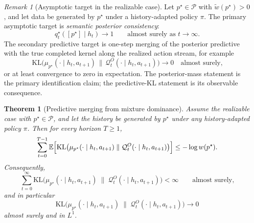 \documentclass[11pt]{article}
\newtheorem{theorem}[definition]{Theorem}
\theoremstyle{remark}
\newtheorem{remark}[definition]{Remark}
\newcommand{\Pcal}{\mathcal{P}}
\newcommand{\Qcal}{\mathcal{Q}}
\newcommand{\E}{\mathbb{E}}
\newcommand{\KL}{\mathrm{KL}}
\newcommand{\wt}{\widetilde}
\begin{document}
\begin{remark}[Asymptotic target in the realizable case]
Let \(p^\star \in \Pcal\) with \(\wt w(p^\star) > 0\), and let data be generated by \(p^\star\) under a history-adapted policy \(\pi\). The primary asymptotic target is \emph{semantic posterior consistency}:
\[
q_t^\star([p^\star]\mid h_t) \to 1
\qquad\text{almost surely as } t\to\infty.
\]
The secondary predictive target is one-step merging of the posterior predictive with the true completed kernel along the realized action stream, for example
\[
\KL\bigl(\mu_{p^\star}(\cdot\mid h_t,a_{t+1}) \,\|\, \Qcal_t^O(\cdot\mid h_t,a_{t+1})\bigr) \to 0
\quad\text{almost surely,}
\]
or at least convergence to zero in expectation. The posterior-mass statement is the primary identification claim; the predictive-KL statement is its observable consequence.
\end{remark}

\begin{theorem}[Predictive merging from mixture dominance]
\label{thm:predictive-merging}
Assume the realizable case with \(p^\star \in \Pcal\), and let the history be generated by \(p^\star\) under any history-adapted policy \(\pi\). Then for every horizon \(T \ge 1\),
\[
\sum_{t=0}^{T-1}
\E\Bigl[
\KL\bigl(
\mu_{p^\star}(\cdot\mid h_t,a_{t+1})
\;\|\;
\Qcal_t^O(\cdot\mid h_t,a_{t+1})
\bigr)
\Bigr]
\le -\log w(p^\star).
\]
Consequently,
\[
\sum_{t=0}^{\infty}
\KL\bigl(
\mu_{p^\star}(\cdot\mid h_t,a_{t+1})
\;\|\;
\Qcal_t^O(\cdot\mid h_t,a_{t+1})
\bigr)
< \infty
\qquad\text{almost surely,}
\]
and in particular
\[
\KL\bigl(
\mu_{p^\star}(\cdot\mid h_t,a_{t+1})
\;\|\;
\Qcal_t^O(\cdot\mid h_t,a_{t+1})
\bigr)
\to 0
\]
almost surely and in \(L^1\).
\end{theorem}
\end{document}
